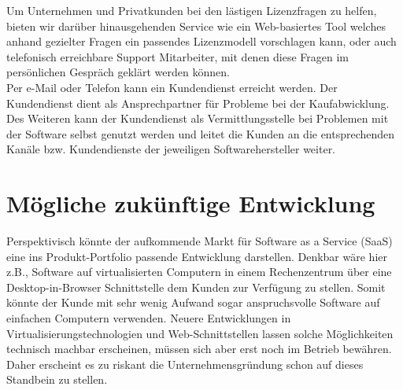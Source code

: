 Um Unternehmen und Privatkunden bei den lästigen Lizenzfragen zu helfen, bieten wir darüber hinausgehenden Service wie ein Web-basiertes Tool welches anhand gezielter Fragen ein passendes Lizenzmodell vorschlagen kann, oder auch telefonisch erreichbare Support Mitarbeiter, mit denen diese Fragen im persönlichen Gespräch geklärt werden können.\\ 

Per e-Mail oder Telefon kann ein Kundendienst erreicht werden. Der Kundendienst dient als Ansprechpartner für Probleme bei der Kaufabwicklung. Des Weiteren kann der Kundendienst als Vermittlungsstelle bei Problemen mit der Software selbst genutzt werden und leitet die Kunden an die entsprechenden Kanäle bzw.  Kundendienste der jeweiligen Softwarehersteller weiter. \\

\section{Mögliche zukünftige Entwicklung}
Perspektivisch könnte der aufkommende Markt für Software as a Service (SaaS) eine ins Produkt-Portfolio passende Entwicklung darstellen. Denkbar wäre hier z.B., Software auf virtualisierten Computern in einem Rechenzentrum über eine Desktop-in-Browser Schnittstelle dem Kunden zur Verfügung zu stellen. Somit könnte der Kunde mit sehr wenig Aufwand sogar anspruchsvolle Software auf einfachen Computern verwenden. Neuere Entwicklungen in Virtualisierungstechnologien und Web-Schnittstellen lassen solche Möglichkeiten technisch machbar erscheinen, müssen sich aber erst noch im Betrieb bewähren. Daher erscheint es zu riskant die Unternehmensgründung schon auf dieses Standbein zu stellen.

